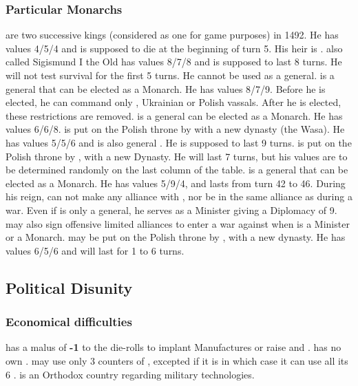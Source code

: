 \subsubsection{Particular Monarchs}
 are two successive kings
(considered as one for game purposes) in 1492.  He has values 4/5/4 and
is supposed to die at the beginning of turn 5. His heir is
.
 also called Sigismund I the Old has
values 8/7/8 and is supposed to last 8 turns. He will not test survival
for the first 5 turns. He cannot be used as a general.
 is a general 
that can be elected as a Monarch. He has values 8/7/9.
\bparag Before he is elected, he can command only \LD, Ukrainian \ARMY
or Polish vassals.
\bparag After he is elected, these restrictions are removed.
 is a general
 can be elected as a Monarch. He has values
6/6/8.
 is put on the Polish throne by
 with a new dynasty (the Wasa). He
has values 5/5/6 and is also general . He is
supposed to last 9 turns.
 is put on the Polish throne by
, with a new Dynasty. He will last 7
turns, but his values are to be determined randomly on the last column
of the table.
 is a general 
that can be elected as a Monarch. He has values 5/9/4, and lasts from
turn 42 to 46. During his reign, \POL can not make any alliance with
\SUE, nor be in the same alliance as \SUE during a war.
 Even if  is only a
general, he serves as a Minister giving a Diplomacy of 9. \POL may also
sign offensive limited alliances to enter a war against \SUE when
 is a Minister or a Monarch.
 may be put on the Polish throne by
, with a new dynasty. He has
values 6/5/6 and will last for 1 to 6 turns.

\subsection{Political Disunity}
\subsubsection{Economical difficulties}
\aparag \POL has a malus of {\bf -1} to the die-rolls to implant
Manufactures or raise \FTI and \DTI.
\aparag \POL has no own \CTZ.
\aparag \POL may use only 3 counters of \TradeFLEET, excepted if it is
 in which case it can use all its 6 \TradeFLEET.
\aparag \POL is an Orthodox country regarding military technologies.
